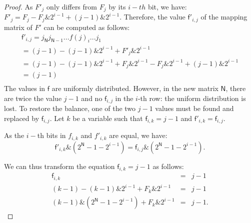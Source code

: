 \begin{proof}
As $F'_j$ only differs from $F_j$ by its $i-th$ bit, we have: $F'_j=F_j-F_j\&2^{i-1}+(j-1)\&2^{i-1}.$
Therefore, the value $\mathsf{f}'_{i,j}$ of the mapping matrix of $F'$ can be computed as follows:
\begin{equation}
\label{eq2}
\begin{array}{l}
\mathsf{f}'_{i,j}=j_\mathsf{N}j_{\mathsf{N}-1}...f(j)_i...j_1 \\
=(j-1)-(j-1)\&2^{i-1}+F'_j\&2^{i-1}\\
=(j-1)-(j-1)\&2^{i-1}+F_j\&2^{i-1}-F_j\&2^{i-1}+(j-1)\&2^{i-1}\\
=(j-1)\\
\end{array}
\end{equation}
The values in $\mathsf{f}$ are uniformly distributed.
However, in the new matrix $\mathsf{N}$, there are twice the value $j-1$ and no $\mathsf{f}_{i,j}$ in the $i$-th row: the uniform distribution is lost. 
To restore the balance, one of the two $j-1$ values must be found and replaced by $\mathsf{f}_{i,j}$. Let $k$ be a variable such that $\mathsf{f}_{i,k}=j-1$ and $\mathsf{f}'_{i,k}=\mathsf{f}_{i,j}$.

As the $i-$th bits in ${f}_{i,k}$ and ${f}'_{i,k}$ are equal, we have:
\begin{equation}
\label{eq5}
\mathsf{f}'_{i,k}\&(2^\mathsf{N}-1-2^{i-1})=\mathsf{f}_{i,j}\&(2^\mathsf{N}-1-2^{i-1}).
\end{equation}

We can thus transform the equation $\mathsf{f}_{i,k}=j-1$ as follows:
\begin{equation}
\label{eq6}
\begin{array}{lll}
\mathsf{f}_{i,k}&=&j-1\\
(k-1)-(k-1)\&2^{i-1}+F_k\&2^{i-1}& =&j-1\\
(k-1)\&(2^\mathsf{N}-1-2^{i-1})+F_k\&2^{i-1}&=&j-1.
\end{array}
\end{equation}


\end{proof}
